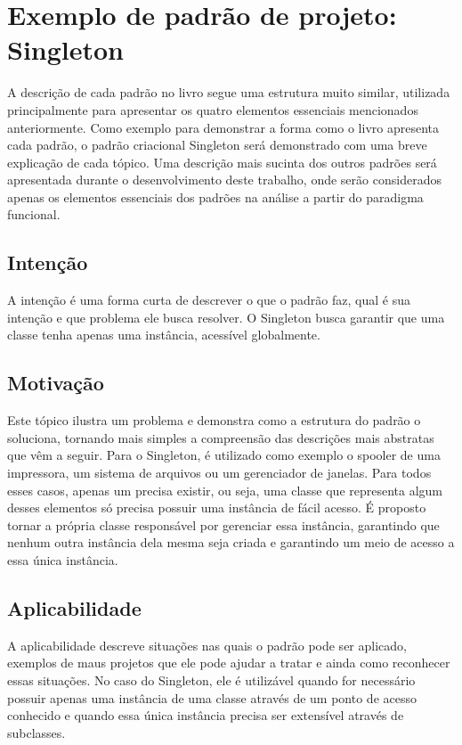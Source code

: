 \section{Exemplo de padrão de projeto: Singleton}

A descrição de cada padrão no livro segue uma estrutura 
muito similar, utilizada principalmente para apresentar 
os quatro elementos essenciais mencionados anteriormente. 
Como exemplo para demonstrar a forma como o livro 
apresenta cada padrão, o padrão criacional Singleton será 
demonstrado com uma breve explicação de cada tópico. 
Uma descrição mais sucinta dos outros padrões será 
apresentada durante o desenvolvimento deste 
trabalho, onde serão considerados apenas os elementos 
essenciais dos padrões na análise 
a partir do paradigma funcional.

\subsection*{Intenção}

A intenção é uma forma curta de descrever o que o padrão 
faz, qual é sua intenção e que problema ele busca resolver. 
O Singleton busca garantir que uma classe tenha apenas uma
instância, acessível globalmente.

\subsection*{Motivação}

Este tópico ilustra um problema e demonstra como a estrutura 
do padrão o soluciona, tornando mais simples a compreensão 
das descrições mais abstratas que vêm a seguir. Para o 
Singleton, é utilizado como exemplo o spooler de uma 
impressora, um sistema de arquivos ou um gerenciador de 
janelas. Para todos esses casos, apenas um precisa existir, 
ou seja, uma classe que representa algum desses elementos 
só precisa possuir uma instância de fácil acesso. É proposto 
tornar a própria classe responsável por gerenciar essa 
instância, garantindo que nenhum outra instância dela 
mesma seja criada e garantindo um meio de acesso a essa 
única instância.

\subsection*{Aplicabilidade}

A aplicabilidade descreve situações nas quais o padrão 
pode ser aplicado, exemplos de maus projetos que ele pode 
ajudar a tratar e ainda como reconhecer essas situações. 
No caso do Singleton, ele é utilizável quando for necessário 
possuir apenas uma instância de uma classe através de um 
ponto de acesso conhecido e quando essa única instância 
precisa ser extensível através de subclasses. 


